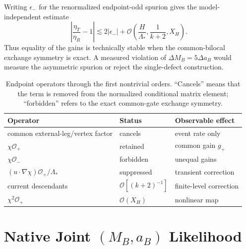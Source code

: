\documentclass[aps,prd,twocolumn,10pt,superscriptaddress,nofootinbib]{revtex4-2}
\begin{document}
Writing $\epsilon_-$ for the renormalized endpoint-odd spurion gives the
model-independent estimate
\begin{equation}
 \left|\frac{\eta_T}{\eta_R}-1\right|
 \lesssim 2|\epsilon_-|
 +\mathcal O\!\left(\frac{H}{\Lambda_*},
 \frac{1}{k+2},X_H\right).
 \label{eq:pb_gain_ratio_bound}
\end{equation}
Thus equality of the gains is technically stable when the common-bilocal
exchange symmetry is exact.  A measured violation of
$\Delta M_B=5\Delta a_B$ would measure the asymmetric spurion or reject the
single-defect construction.

\begin{table}[t]
\caption{Endpoint operators through the first nontrivial orders.  ``Cancels''
means that the term is removed from the normalized conditional matrix
element; ``forbidden'' refers to the exact common-gate exchange symmetry.}
\label{tab:pb_counterterms}
\begin{ruledtabular}
\begin{tabular}{@{}p{}p{}p{}@{}}
Operator & Status & Observable effect\\
\hline
common external-leg/vertex factor & cancels & event rate only\\
$\chi\mathcal O_+$ & retained & common gain $g_+$\\
$\chi\mathcal O_-$ & forbidden & unequal gains\\
$(u\cdot\nabla\chi)\mathcal O_+/\Lambda_*$ & suppressed & transient correction\\
current descendants & $\mathcal O[(k+2)^{-1}]$ & finite-level correction\\
$\chi^2\mathcal O_+$ & $\mathcal O(X_H)$ & nonlinear map\\
\end{tabular}
\end{ruledtabular}
\end{table}

\section{Native Joint \texorpdfstring{$(M_B,a_B)$}{(M_B,a_B)} Likelihood}
\label{sec:native_joint_likelihood}

\end{document}
